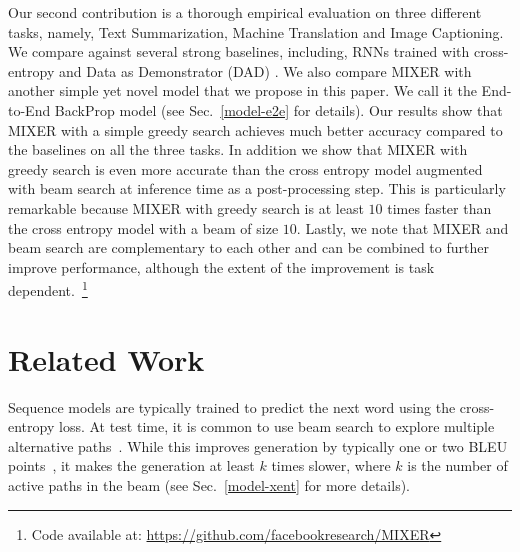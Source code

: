 Our second contribution is a thorough empirical evaluation on three 
different tasks, namely, Text Summarization, Machine Translation and Image Captioning.
We compare against several strong baselines, including, RNNs trained with cross-entropy and Data as Demonstrator (DAD) \citep{sbengio-nips2015, dad}. 
We also compare MIXER with another simple yet novel model that we propose in this paper. We call it the End-to-End BackProp model (see Sec.~\ref{model-e2e} for details). 
Our results show that MIXER with a simple greedy search achieves much better accuracy compared to the baselines on all the three tasks. In addition we show that MIXER with greedy search is even more accurate than the cross entropy model augmented with beam search at inference time as a post-processing step. This is particularly remarkable because MIXER with greedy search is at least $10$ times faster than the cross entropy model with a beam of size $10$. Lastly, we  note that MIXER and beam search are complementary to each other and can be combined to further improve performance, although the extent of the improvement is task dependent.~\footnote{Code available at: \url{https://github.com/facebookresearch/MIXER}}

\section{Related Work}
Sequence models are typically trained to predict the next
word using the cross-entropy loss. At test time, it is common to use beam search to 
explore  multiple alternative paths~\citep{sutskever2014,bahdanau-iclr2015,rush-2015}.
While this improves generation by typically one or two BLEU points~\citep{bleu}, 
it makes the generation at least $k$ times slower, where $k$ is the number of active 
paths in the beam (see Sec.~\ref{model-xent} for more details).


